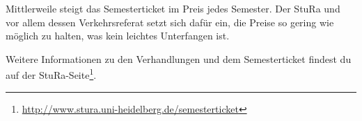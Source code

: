 Mittlerweile steigt das Semesterticket im Preis jedes Semester. Der StuRa und vor allem dessen Verkehrsreferat setzt sich dafür ein, die Preise so gering wie möglich zu halten, was kein leichtes Unterfangen ist.

Weitere Informationen zu den Verhandlungen und dem Semesterticket findest du auf der StuRa-Seite\footnote{\url{http://www.stura.uni-heidelberg.de/semesterticket}}.

